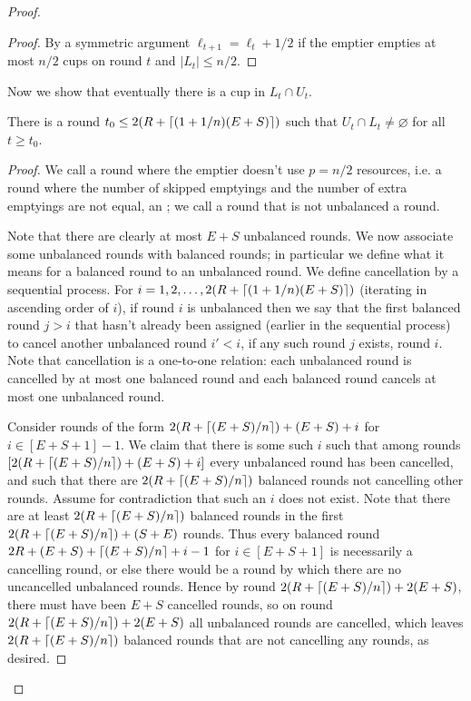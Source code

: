 \begin{proof}
\begin{proof}
    By a symmetric argument $\ell_{t+1} = \ell_{t} +
    1/2$ if the emptier empties at most $n/2$ cups on round $t$
    and $|L_t| \le n/2$. 
  \end{proof}

  Now we show that eventually there is a cup in $L_t \cap U_t$.
  \begin{clm}
    There is a round $t_0 \le 2(R + \left\lceil (1+1/n)(E + S) \right\rceil)$ such that $U_{t}
    \cap L_{t} \neq \varnothing$ for all $t\ge t_0$.
  \end{clm}
  \begin{proof}
  We call a round where the emptier doesn't use $p=n/2$
  resources, i.e. a round where the number of skipped emptyings
  and the number of extra emptyings are not equal, an
  ; we call a round that is not unbalanced a
   round. 

  Note that there are clearly at most $E+S$ unbalanced rounds.
  We now associate some unbalanced rounds with balanced rounds;
  in particular we define what it means for a balanced round to
   an unbalanced round. We define cancellation by a
  sequential process. For $i = 1,2,\ldots,
  2(R+\left\lceil (1+1/n)(E+S) \right\rceil)$ (iterating in ascending order of $i$), if round $i$
  is unbalanced then we say that the first balanced round $j > i$
  that hasn't already been assigned (earlier in the sequential
  process) to cancel another unbalanced round $i' < i$, if any
  such round $j$ exists,  round $i$. Note that
  cancellation is a one-to-one relation: each unbalanced round is
  cancelled by at most one balanced round and each balanced round
  cancels at most one unbalanced round.

  Consider rounds of the form $2(R + \left\lceil (E+S)/n \right\rceil) + (E+S) + i$
  for $i \in [E+S+1]-1$. We claim that there is some such $i$
  such that among rounds $[2(R + \left\lceil (E+S)/n \right\rceil) + (E+S) + i]$
  every unbalanced round has been cancelled, and such that there
  are $2(R+\left\lceil (E+S)/n \right\rceil)$ balanced rounds not cancelling other
  rounds. Assume for contradiction that such an $i$ does not
  exist. Note that there are at least $2(R + \left\lceil (E+S)/n \right\rceil)$
  balanced rounds in the first $2(R + \left\lceil (E+S)/n \right\rceil) + (S+E)$
  rounds. Thus every balanced round $2R+(E+S)+\left\lceil (E+S)/n \right\rceil +
  i-1$ for $i \in [E+S+1]$ is necessarily a cancelling round, or
  else there would be a round by which there are no uncancelled
  unbalanced rounds. Hence by round $2(R + \left\lceil (E+S)/n \right\rceil) + 2(E +
  S)$, there must have been $E+S$ cancelled rounds, so on round
  $2(R + \left\lceil (E+S)/n \right\rceil) + 2(E+S)$ all unbalanced rounds are
  cancelled, which leaves $2(R + \left\lceil (E+S)/n \right\rceil)$ balanced rounds
  that are not cancelling any rounds, as desired.


\end{proof}
\end{proof}
